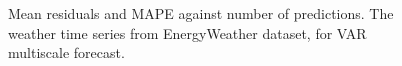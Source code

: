 \documentclass[conference]{IEEEtran}
\begin{document}
\begin{figure}[!h]
\centering
{}
\caption{Mean residuals and MAPE against number of predictions. The weather time series from EnergyWeather dataset, for VAR multiscale forecast.}\label{fg:frch_Solar_VAR}
\end{figure}
\end{document}
